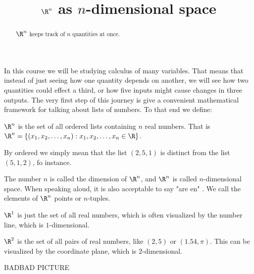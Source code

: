 \documentclass{ximera}
\begin{document}
\title{$\R^n$ as $n$-dimensional space}
\begin{abstract}
	$\R^n$ keeps track of $n$ quantities at once.
\end{abstract}\maketitle
In this course we will be studying calculus of many variables.  That means that instead of just seeing how one quantity depends on another, we will see
how two quantities could effect a third, or how five inputs might cause changes in three outputs.  The very first step of this journey is give a convenient mathematical 
framework for talking about lists of numbers.  To that end we define:

\begin{definition}
  $\R^n$ is the set of all ordered lists containing $n$ real numbers.  That is $\R^n = \{ (x_1,x_2,\dots, x_n) : x_1,x_2,\dots, x_n \in \R \}$.
\end{definition}

By ordered we simply mean that the list $(2,5,1)$ is distinct from the list $(5,1,2)$, fo instance.

The number $n$ is called the dimension of $\R^n$, and $\R^n$ is called $n$-dimensional space.  When speaking aloud, it is also acceptable to say "are en" .
 We call the elements of $\R^n$ points or $n$-tuples.

\begin{example}
	$\R^1$ is just the set of all real numbers, which is often visualized by the number line, which is $1$-dimensional.
\end{example}



\begin{example}
	$\R^2$ is the set of all pairs of real numbers, like $(2,5)$ or $(1.54,\pi)$. This can be visualized by the coordinate plane, which is $2$-dimensional.
	
	BADBAD PICTURE
	
\end{example}

\end{document}

